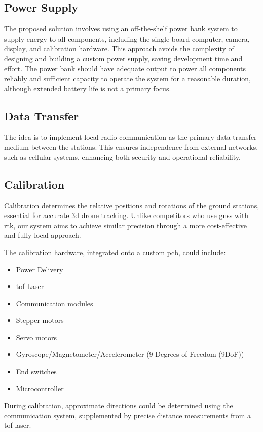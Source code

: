 \subsection{Power Supply}
The proposed solution involves using an off-the-shelf power bank system to supply energy to all components, including the single-board computer, camera, display, and calibration hardware. This approach avoids the complexity of designing and building a custom power supply, saving development time and effort. The power bank should have adequate output to power all components reliably and sufficient capacity to operate the system for a reasonable duration, although extended battery life is not a primary focus.

\subsection{Data Transfer}
The idea is to implement local radio communication as the primary data transfer medium between the stations. This ensures independence from external networks, such as cellular systems, enhancing both security and operational reliability.

\subsection{Calibration}
Calibration determines the relative positions and rotations of the ground stations, essential for accurate \acrshort{3d} drone tracking. Unlike competitors who use \acrshort{gnss} with \acrshort{rtk}, our system aims to achieve similar precision through a more cost-effective and fully local approach. 

The calibration hardware, integrated onto a custom \acrfull{pcb}, could include:
\begin{itemize}
	\item Power Delivery
	\item \acrfull{tof} Laser
	\item Communication modules
	\item Stepper motors
	\item Servo motors
	\item Gyroscope/Magnetometer/Accelerometer (9 Degrees of Freedom (9DoF))
	\item End switches
	\item Microcontroller
\end{itemize}

During calibration, approximate directions could be determined using the communication system, supplemented by precise distance measurements from a \acrshort{tof} laser.


